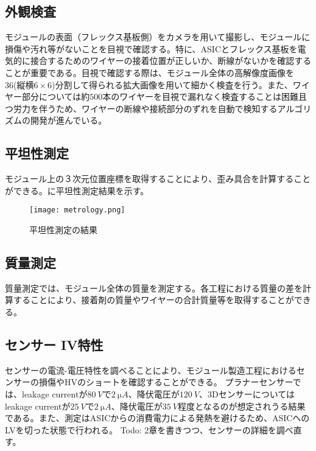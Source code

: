 \subsection{外観検査}
\label{sec:visualinsp}
モジュールの表面（フレックス基板側）をカメラを用いて撮影し、モジュールに損傷や汚れ等がないことを目視で確認する。特に、ASICとフレックス基板を電気的に接合するためのワイヤーの接着位置が正しいか、断線がないかを確認することが重要である。目視で確認する際は、モジュール全体の高解像度画像を36(縦横$6\times6$)分割して得られる拡大画像を用いて細かく検査を行う。また、ワイヤー部分については約$500$本のワイヤーを目視で漏れなく検査することは困難且つ労力を伴うため、ワイヤーの断線や接続部分のずれを自動で検知するアルゴリズムの開発が進んでいる。

\subsection{平坦性測定}
\label{sec:metrology}
モジュール上の３次元位置座標を取得することにより、歪み具合を計算することができる。に平坦性測定結果を示す。

\begin{figure}[tbp]
  \centering
  \texttt{[image: metrology.png]}
  \caption[平坦性測定の結果]{平坦性測定の結果 }
  \label{fig:metrology}
\end{figure}

\subsection{質量測定}
\label{sec:mass}
質量測定では、モジュール全体の質量を測定する。各工程における質量の差を計算することにより、接着剤の質量やワイヤーの合計質量等を取得することができる。

\subsection{センサー IV特性}
\label{sec:sensoriv}
センサーの電流-電圧特性を調べることにより、モジュール製造工程におけるセンサーの損傷やHVのショートを確認することができる。
プラナーセンサーでは、leakage currentが$80\ \si{V}$で$2\ \si{\micro A}$、降伏電圧が$120\ \si{V}$、3Dセンサーについてはleakage currentが$25\ \si{V}$で$2\ \si{\micro A}$、降伏電圧が$35\ \si{V}$程度となるのが想定されうる結果である。また、測定はASICからの消費電力による発熱を避けるため、ASICへのLVを切った状態で行われる。
Todo: 2章を書きつつ、センサーの詳細を調べ直す。


